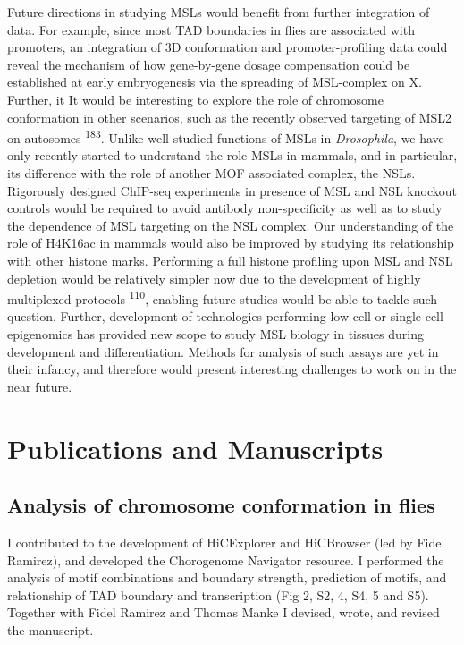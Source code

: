 \documentclass[11pt,twoside]{MPIthesis}
\theoremstyle{definition}
\theoremstyle{definition}
\theoremstyle{definition}
\theoremstyle{remark}
\begin{document}
Future directions in studying MSLs would benefit from further
integration of data. For example, since most TAD boundaries in flies are
associated with promoters, an integration of 3D conformation and
promoter-profiling data could reveal the mechanism of how gene-by-gene
dosage compensation could be established at early embryogenesis via the
spreading of MSL-complex on X. Further, it It would be interesting to
explore the role of chromosome conformation in other scenarios, such as
the recently observed targeting of MSL2 on autosomes
\textsuperscript{183}. Unlike well studied functions of MSLs in
\emph{Drosophila}, we have only recently started to understand the role
MSLs in mammals, and in particular, its difference with the role of
another MOF associated complex, the NSLs. Rigorously designed ChIP-seq
experiments in presence of MSL and NSL knockout controls would be
required to avoid antibody non-specificity as well as to study the
dependence of MSL targeting on the NSL complex. Our understanding of the
role of H4K16ac in mammals would also be improved by studying its
relationship with other histone marks. Performing a full histone
profiling upon MSL and NSL depletion would be relatively simpler now due
to the development of highly multiplexed protocols
\textsuperscript{110}, enabling future studies would be able to tackle
such question. Further, development of technologies performing low-cell
or single cell epigenomics has provided new scope to study MSL biology
in tissues during development and differentiation. Methods for analysis
of such assays are yet in their infancy, and therefore would present
interesting challenges to work on in the near future.

\appendix

\chapter{Publications and
Manuscripts}\label{publications-and-manuscripts}

\section{Analysis of chromosome conformation in
flies}\label{analysis-of-chromosome-conformation-in-flies}

I contributed to the development of HiCExplorer and HiCBrowser (led by
Fidel Ramirez), and developed the Chorogenome Navigator resource. I
performed the analysis of motif combinations and boundary strength,
prediction of motifs, and relationship of TAD boundary and transcription
(Fig 2, S2, 4, S4, 5 and S5). Together with Fidel Ramirez and Thomas
Manke I devised, wrote, and revised the manuscript.
\end{document}
